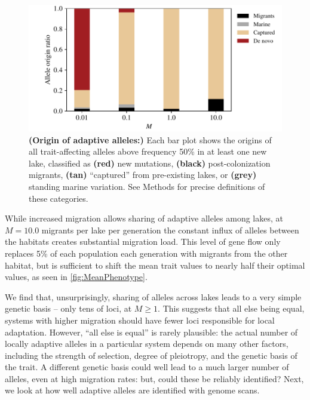 \documentclass{article}
\begin{document}
\begin{figure}
    \begin{center}
    \includegraphics{Final_Plots/Allele_Origin_2.pdf}
    \caption{ 
        \textbf{(Origin of adaptive alleles:)}
        Each bar plot shows the origins
        of all trait-affecting alleles above frequency 50\% in at least one new lake,
        classified as
        \textbf{(red)} new mutations,
        \textbf{(black)} post-colonization migrants,
        \textbf{(tan)} ``captured'' from pre-existing lakes, or
        \textbf{(grey)} standing marine variation.
        See Methods for precise definitions of these categories.
    } \label{fig:Origin}
    \end{center}
\end{figure}

While increased migration allows sharing of adaptive alleles among lakes, at $M = 10.0$ migrants per lake per generation
the constant influx of alleles between the habitats creates substantial migration load. 
This level of gene flow only replaces 5\% of each population each generation with migrants from the other habitat, 
but is sufficient to shift the mean trait values to nearly half their optimal values, as seen in \autoref{fig:MeanPhenotype}. 

We find that, unsurprisingly, sharing of alleles across lakes leads to
a very simple genetic basis -- only tens of loci, at $M \ge 1$.
This suggests that all else being equal, systems with higher migration
should have fewer loci responsible for local adaptation.
However, ``all else is equal'' is rarely plausible:
the actual number of locally adaptive alleles in a particular system
depends on many other factors, including
the strength of selection, degree of pleiotropy, and the genetic basis of the trait. 
A different genetic basis could well lead to a much larger number of alleles, even at high migration rates:
but, could these be reliably identified?
Next, we look at how well adaptive alleles are identified with genome scans.
\end{document}
